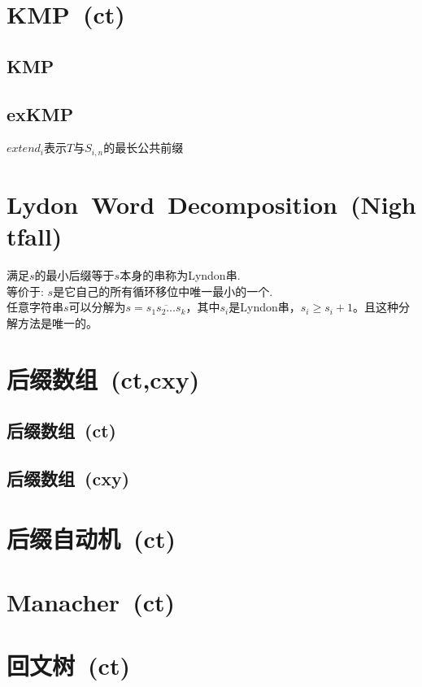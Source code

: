\section{KMP\ \small(ct)}
    \subsection*{KMP}
    \subsection*{exKMP}
        $ extend_i $表示$ T $与$ S_{i,n} $的最长公共前缀
\section{Lydon\ Word\ Decomposition\ \small(Nightfall)}
    满足$ s $的最小后缀等于$ s $本身的串称为Lyndon串.
    \\等价于: $ s $是它自己的所有循环移位中唯一最小的一个.
    \\任意字符串$ s $可以分解为$ s = \overline{s_1 s_2 \dots s_k} $，其中$ s_i $是Lyndon串，$ s_i \geq s_i + 1 $。且这种分解方法是唯一的。
\section{后缀数组\ \small(ct,cxy)}
    \subsection*{后缀数组\ \small(ct)}
    \subsection*{后缀数组\ \small(cxy)}
\section{后缀自动机\ \small(ct)}
\section{Manacher\ \small(ct)}
\section{回文树\ \small(ct)}
